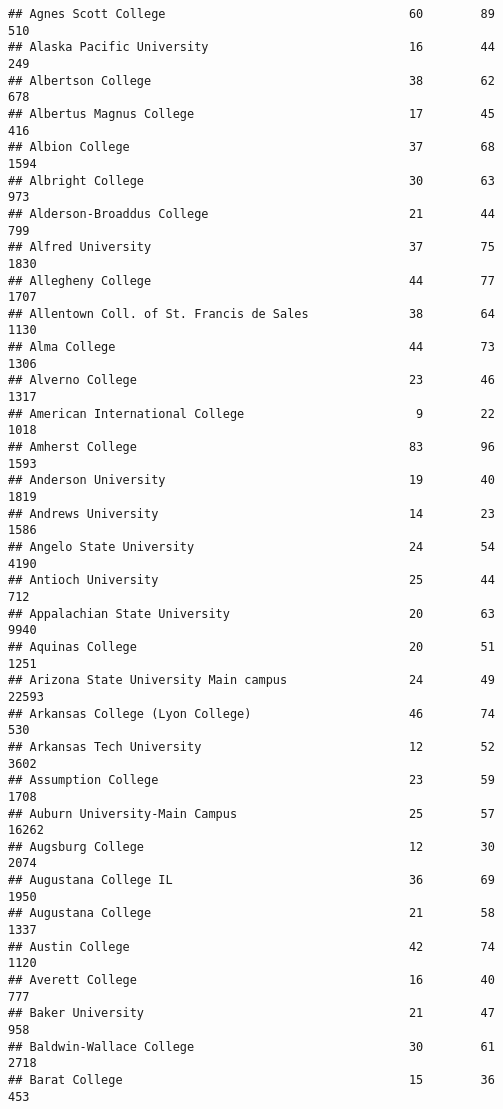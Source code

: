 \documentclass[
]{article}
\begin{document}
\begin{verbatim}
## Agnes Scott College                                  60        89         510
## Alaska Pacific University                            16        44         249
## Albertson College                                    38        62         678
## Albertus Magnus College                              17        45         416
## Albion College                                       37        68        1594
## Albright College                                     30        63         973
## Alderson-Broaddus College                            21        44         799
## Alfred University                                    37        75        1830
## Allegheny College                                    44        77        1707
## Allentown Coll. of St. Francis de Sales              38        64        1130
## Alma College                                         44        73        1306
## Alverno College                                      23        46        1317
## American International College                        9        22        1018
## Amherst College                                      83        96        1593
## Anderson University                                  19        40        1819
## Andrews University                                   14        23        1586
## Angelo State University                              24        54        4190
## Antioch University                                   25        44         712
## Appalachian State University                         20        63        9940
## Aquinas College                                      20        51        1251
## Arizona State University Main campus                 24        49       22593
## Arkansas College (Lyon College)                      46        74         530
## Arkansas Tech University                             12        52        3602
## Assumption College                                   23        59        1708
## Auburn University-Main Campus                        25        57       16262
## Augsburg College                                     12        30        2074
## Augustana College IL                                 36        69        1950
## Augustana College                                    21        58        1337
## Austin College                                       42        74        1120
## Averett College                                      16        40         777
## Baker University                                     21        47         958
## Baldwin-Wallace College                              30        61        2718
## Barat College                                        15        36         453

\end{verbatim}
\end{document}
